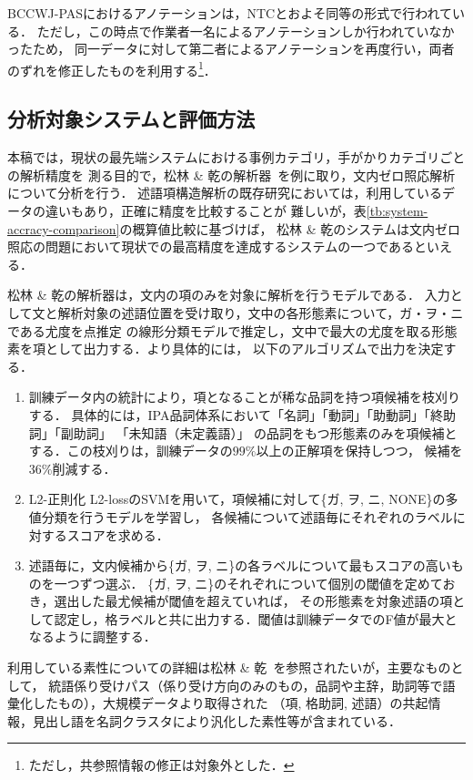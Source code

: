 \documentclass[japanese]{jnlp_1.4}
\begin{document}
BCCWJ-PASにおけるアノテーションは，NTCとおよそ同等の形式で行われている．
ただし，この時点で作業者一名によるアノテーションしか行われていなかったため，
同一データに対して第二者によるアノテーションを再度行い，両者のずれを修正したものを利用する\footnote{ただし，共参照情報の修正は対象外とした．}．


\subsection{分析対象システムと評価方法}

本稿では，現状の最先端システムにおける事例カテゴリ，手がかりカテゴリごとの解析精度を
測る目的で，松林 \& 乾の解析器~\cite{matsubayashi2014}を例に取り，文内ゼロ照応解析について分析を行う．
述語項構造解析の既存研究においては，利用しているデータの違いもあり，正確に精度を比較することが
難しいが，表\ref{tb:system-accracy-comparison}の概算値比較に基づけば，
松林 \& 乾のシステムは文内ゼロ照応の問題において現状での最高精度を達成するシステムの一つであるといえる．

松林 \& 乾の解析器は，文内の項のみを対象に解析を行うモデルである．
入力として文と解析対象の述語位置を受け取り，文中の各形態素について，ガ・ヲ・ニである尤度を点推定
の線形分類モデルで推定し，文中で最大の尤度を取る形態素を項として出力する．より具体的には，
以下のアルゴリズムで出力を決定する．

\begin{enumerate}
  \item 訓練データ内の統計により，項となることが稀な品詞を持つ項候補を枝刈りする．
具体的には，IPA品詞体系において「名詞」「動詞」「助動詞」「終助詞」「副助詞」
「未知語（未定義語）」 
の品詞をもつ形態素のみを項候補とする．この枝刈りは，訓練データの$99\%$以上の正解項を保持しつつ，
候補を$36\%$削減する．
\item L2-正則化 L2-lossのSVMを用いて，項候補に対して\{ガ, ヲ, ニ, NONE\}の多値分類を行うモデルを学習し，
各候補について述語毎にそれぞれのラベルに対するスコアを求める．
\item 述語毎に，文内候補から\{ガ, ヲ, ニ\}の各ラベルについて最もスコアの高いものを一つずつ選ぶ．
\{ガ, ヲ, ニ\}のそれぞれについて個別の閾値を定めておき，選出した最尤候補が閾値を超えていれば，
その形態素を対象述語の項として認定し，格ラベルと共に出力する．閾値は訓練データでのF値が最大となるように調整する．
\end{enumerate}

利用している素性についての詳細は松林 \& 乾~\cite{matsubayashi2014}を参照されたいが，主要なものとして，
統語係り受けパス（係り受け方向のみのもの，品詞や主辞，助詞等で語彙化したもの），大規模データより取得された
（項, 格助詞, 述語）の共起情報，見出し語を名詞クラスタにより汎化した素性等が含まれている．
\end{document}
